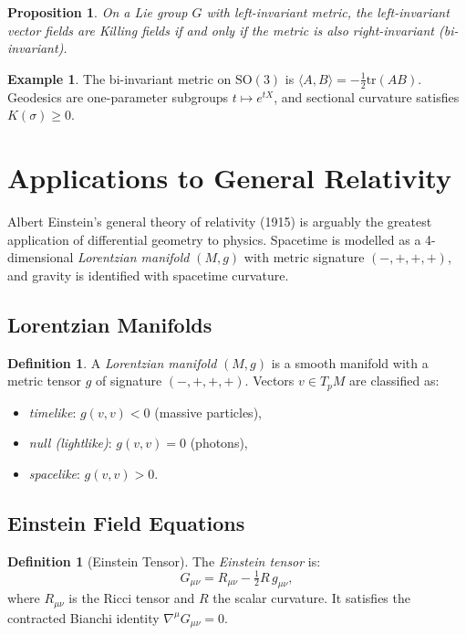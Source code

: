 \documentclass[12pt,a4paper]{amsart}
\newtheorem{proposition}[theorem]{Proposition}
\theoremstyle{definition}
\newtheorem{definition}[theorem]{Definition}
\newtheorem{example}[theorem]{Example}
\begin{document}
\begin{proposition}
On a Lie group $G$ with left-invariant metric, the left-invariant vector
fields are Killing fields if and only if the metric is also right-invariant
(\emph{bi-invariant}).
\end{proposition}

\begin{example}
The bi-invariant metric on $\mathrm{SO}(3)$ is $\langle A, B \rangle = -\tfrac{1}{2}\mathrm{tr}(AB)$.
Geodesics are one-parameter subgroups $t \mapsto e^{tX}$, and sectional
curvature satisfies $K(\sigma) \geq 0$.
\end{example}

\section{Applications to General Relativity}
\label{sec:applications}

Albert Einstein's general theory of relativity (1915) is arguably the
greatest application of differential geometry to physics. Spacetime is
modelled as a 4-dimensional \emph{Lorentzian manifold} $(M, g)$ with
metric signature $(-,+,+,+)$, and gravity is identified with spacetime
curvature.

\subsection{Lorentzian Manifolds}

\begin{definition}
A \emph{Lorentzian manifold} $(M, g)$ is a smooth manifold with a metric
tensor $g$ of signature $(-,+,+,+)$. Vectors $v \in T_pM$ are classified as:
\begin{itemize}
  \item \emph{timelike}: $g(v,v) < 0$ (massive particles),
  \item \emph{null (lightlike)}: $g(v,v) = 0$ (photons),
  \item \emph{spacelike}: $g(v,v) > 0$.
\end{itemize}
\end{definition}

\subsection{Einstein Field Equations}

\begin{definition}[Einstein Tensor]
The \emph{Einstein tensor} is:
\[
  G_{\mu\nu} = R_{\mu\nu} - \tfrac{1}{2} R\,g_{\mu\nu},
\]
where $R_{\mu\nu}$ is the Ricci tensor and $R$ the scalar curvature.
It satisfies the contracted Bianchi identity $\nabla^\mu G_{\mu\nu} = 0$.
\end{definition}
\end{document}

